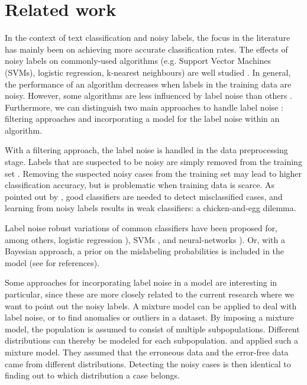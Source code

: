 \documentclass[12pt, a4paper, titlepage]{article}
\begin{document}
							\section{Related work}
							\label{section:related}
In the context of text classification and noisy labels, the focus in the literature has mainly been on achieving more accurate classification rates. The effects of noisy labels on commonly-used algorithms (e.g. Support Vector Machines (SVMs), logistic regression, k-nearest neighbours) are well studied \citep{Pech, Nettleton}. In general, the performance of an algorithm decreases when labels in the training data are noisy. However, some algorithms are less influenced by label noise than others \citep{Frenay}. Furthermore, we can distinguish two main approaches to handle label noise \citep{Frenay}: filtering approaches and incorporating a model for the label noise within an algorithm. 

With a filtering approach, the label noise is handled in the data preprocessing stage. Labels that are suspected to be noisy are simply removed from the training set \citep{Brodley}. Removing the suspected noisy cases from the training set may lead to higher classification accuracy, but is problematic when training data is scarce. As pointed out by \citet{Angelova}, good classifiers are needed to detect misclassified cases, and learning from noisy labels results in weak classifiers: a chicken-and-egg dilemma.

Label noise robust variations of common classifiers have been proposed for, among others, logistic regression \citep{Bootkrajang, Rantalainen}), SVMs \citep{Stempfel, Biggio}, and neural-networks \citep{Sigurdsson, Sukhbaatar}). Or, with a Bayesian approach, a prior on the mislabeling probabilities is included in the model (see \citet{Frenay} for references).

Some approaches for incorporating label noise in a model are interesting in particular, since these are more closely related to the current research where we want to point out the noisy labels. A mixture model can be applied to deal with label noise, or to find anomalies or outliers in a dataset. By imposing a mixture model, the population is assumed to consist of multiple subpopulations. Different distributions can thereby be modeled for each subpopulation. \citet{DiZio} and \citet{Eskin} applied such a mixture model. They assumed that the erroneous data and the error-free data came from different distributions. Detecting the noisy cases is then identical to finding out to which distribution a case belongs.
\end{document}
